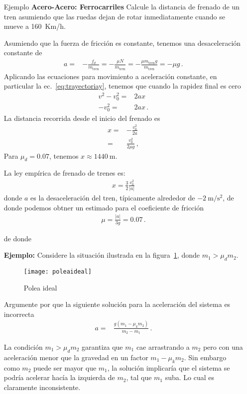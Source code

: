 \begin{itemize}
\item[Ejemplo] \textbf{Acero-Acero: Ferrocarriles} Calcule la distancia de frenado de un tren asumiendo que las ruedas dejan de rotar inmediatamente cuando se mueve a 160~Km/h.

Asumiendo que la fuerza de fricción es constante, tenemos una desaceleración constante de
\begin{align}
  a=&-\frac{f_d}{m_{\text{tren}}}=-\frac{\mu N}{m_{\text{tren}}}=-\frac{\mu m_{\text{tren}} g}{m_{\text{tren}}}=
-\mu g\,.
\end{align}
Aplicando las ecuaciones para movimiento a aceleración constante, en particular la ec.~\eqref{eq:trayectoriay}, tenemos que cuando la rapidez final es cero
\begin{align}
  v^2-v^2_0=&2 a x\nonumber\\
  -v^2_0=&2 a x\,.
\end{align}
La distancia recorrida desde el inicio del frenado es
\begin{align}
  x=&-\frac{v^2_0}{2a}\nonumber\\
 =&\frac{v_0^2}{2\mu g}\,,
\end{align}
Para $\mu_d=0.07$, tenemos $x\approx 1440\ $m.

La ley empírica de frenado de trenes es:
\begin{align}
  x=\frac{3}{2}\frac{v_0^2}{|a|}
\end{align}
donde $a$ es la desaceleración del tren, típicamente alrededor de $-2\ \text{m}/\text{s}^2$, de donde podemos obtner un estimado para el coeficiente de fricción
\begin{align*}
  \mu=\frac{|a|}{3g}=0.07\,.
\end{align*}

de donde 
\end{itemize}

\begin{itemize}
\item[\textbf{Ejemplo:}] Considere la situación ilustrada en la figura~\ref{fig:poleaideal}, donde $m_1>\mu_d m_2$. 

\begin{frame}
  \begin{figure}
    \centering
    \texttt{[image: poleaideal]}
    \caption{Polea ideal}
    \label{fig:poleaideal}
  \end{figure}
Argumente por que la siguiente solución para la aceleración del sistema es incorrecta
\begin{align*}
      a=&\frac{g(m_1-\mu_k m_2)}{m_2-m_1}\,.
\end{align*}
\end{frame}

La condición $m_1>\mu_d m_2$  garantiza que $m_1$ cae arrastrando a $m_2$ pero con una aceleración menor que la gravedad en un factor $m_1-\mu_k m_2$. Sin embargo como $m_2$ puede ser mayor que $m_1$, la solución implicaría que el sistema se podría acelerar hacía la izquierda de $m_2$, tal que $m_1$ suba. Lo cual es claramente inconsistente. 

\end{itemize}

